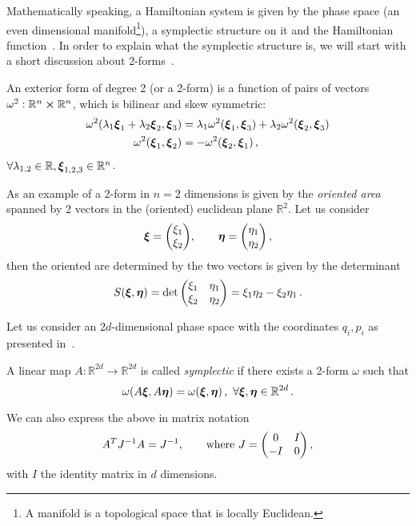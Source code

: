 \documentclass[12pt, class=report, crop=false]{standalone}
\begin{document}
Mathematically speaking, a Hamiltonian system is given by the phase space (an
even dimensional manifold\footnote{A manifold is a topological space that is locally Euclidean.}),
a symplectic structure on it and the Hamiltonian
function~\autocite[160]{arnold_mathematicalmethods_1989}.
In order to explain what the symplectic structure is, we will start with a short
discussion about 2-forms~\autocite[164]{arnold_mathematicalmethods_1989}.

\begin{definition*}
  An exterior form of degree 2 (or a 2-form) is a function of pairs of vectors
  \(\omega^2: \mathbb{R}^n \cp \mathbb{R}^n\), which is bilinear and skew symmetric:
  \begin{align*}
  \omega^2(\lambda_1 \vb*{\xi}_1 + \lambda_2 \vb*{\xi}_2, \vb*{\xi}_3) &=
  \lambda_1 \omega^2(\vb*{\xi}_1, \vb*{\xi}_3) + \lambda_2 \omega^2(\vb*{\xi}_2, \vb*{\xi}_3) \\
  \omega^2(\vb*{\xi}_1,\vb*{\xi}_2) &= -\omega^2(\vb*{\xi}_2, \vb*{\xi}_1)\,,
  \end{align*}
  \(\forall \lambda_{1,2} \in \mathbb{R}, \vb*{\xi}_{1,2,3} \in \mathbb{R}^n\).
\end{definition*}

As an example of a 2-form in \(n=2\) dimensions is given by the \emph{oriented area} spanned by 2 vectors
in the (oriented) euclidean plane \(\mathbb{R}^2\).
Let us consider
\[
\vb*{\xi} = \mqty(\xi_1 \\ \xi_2), \qquad
\vb*{\eta} = \mqty(\eta_1 \\ \eta_2)\,,
\]
then the oriented are determined by the two vectors is given by
the determinant~\autocite{golomb_proofwords_1985}
\[
S(\vb*{\xi},\vb*{\eta}) = \det\mqty(\xi_1 & \eta_1 \\ \xi_2 & \eta_2)
= \xi_1 \eta_2 - \xi_2 \eta_1\,.
\]

Let us consider an \(2d\)-dimensional phase space with the coordinates \(q_i,p_i\) as presented in~\textcite[183]{leimkuhler_simulatinghamiltonian_2004}.

\begin{definition}
  A linear map \(A: \mathbb{R}^{2d} \to \mathbb{R}^{2d}\) is called
  \emph{symplectic} if there exists a 2-form \(\omega\)
  such that
  \[
  \omega(A\vb*{\xi}, A\vb*{\eta}) = \omega(\vb*{\xi},\vb*{\eta})\,,\
  \forall \vb*{\xi}, \vb*{\eta} \in \mathbb{R}^{2d}\,.
  \]
\end{definition}

We can also express the above in matrix notation
\[
A^T J^{-1} A = J^{-1},\qquad \text{where} \ J = \mqty(0 & I \\ -I & 0)\,,
\]
with \(I\) the identity matrix in \(d\) dimensions.
\end{document}
